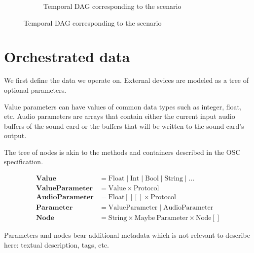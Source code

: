 \documentclass[applsci,article,submit,moreauthors,pdftex,10pt,a4paper]{mdpi}
\DeclareMathOperator{\tc}{TC}
\begin{document}
\begin{figure}
\begin{subfigure}[t!]{0.45\textwidth}
        
        \caption{Temporal DAG corresponding to the scenario}
    \end{subfigure}
\end{figure}

\section{Orchestrated data}\label{sec.device}
We first define the data we operate on.
External devices are modeled as a tree of optional parameters.

Value parameters can have values of common data types such as integer, float, etc.
Audio parameters are arrays that contain either the current input audio buffers of the sound card or the buffers that will be written to the sound card's output.

The tree of nodes is akin to the methods and containers described in the OSC specification.

\begin{align*}
\mathbf{Value} & = \mathrm{Float} \mid \mathrm{Int} \mid \mathrm{Bool} \mid \mathrm{String} \mid \dots \\
\mathbf{ValueParameter} & = \mathrm{Value} \times \mathrm{Protocol} \\
\mathbf{AudioParameter} & = \mathrm{Float[][]} \times \mathrm{Protocol} \\
\mathbf{Parameter} & = \mathrm{ValueParameter} \mid \mathrm{AudioParameter} \\
\mathbf{Node} & = \mathrm{String} \times \mathrm{Maybe}~\mathrm{Parameter} \times \mathrm{Node[]} 
\end{align*}

Parameters and nodes bear additional metadata which is not relevant to describe here: textual description, tags, etc.
\end{document}
